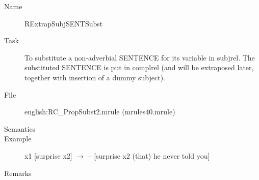 \begin{description}
\vspace{1 cm}
\begin{description}
\item[Name]   RExtrapSubjSENTSubst
\item[Task] To substitute a non-adverbial SENTENCE for its variable in 
subjrel. The substituted SENTENCE is put in complrel (and will be extraposed 
later, together with insertion of a dummy subject).
\item[File] english:RC\_PropSubst2.mrule (mrules40.mrule)
\item[Semantics]
\item[Example] x1 [surprise x2] $\rightarrow$ -- [surprise x2 (that) he never 
told you]
\item[Remarks]
\end{description}


\end{description}
